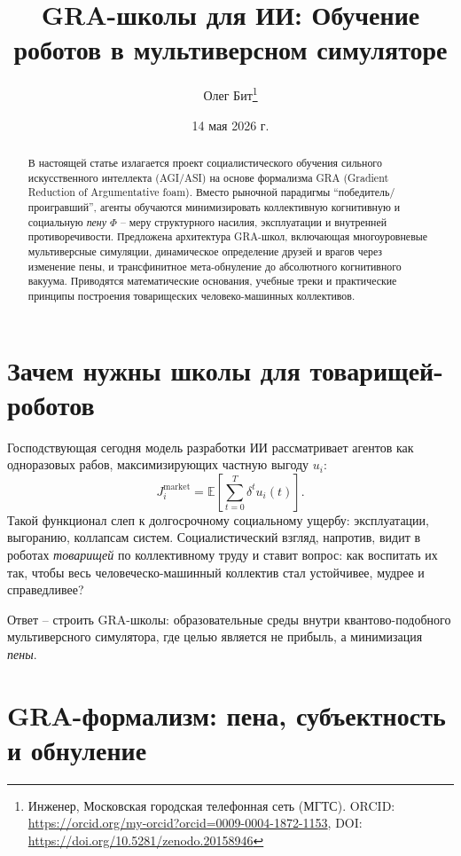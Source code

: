 \documentclass[a4paper,12pt]{article}
\title{\textbf{GRA-школы для ИИ: Обучение роботов в мультиверсном симуляторе}}
\author{Олег Бит\thanks{Инженер, Московская городская телефонная сеть (МГТС). ORCID: \url{https://orcid.org/my-orcid?orcid=0009-0004-1872-1153}, DOI: \url{https://doi.org/10.5281/zenodo.20158946}}}
\date{14 мая 2026 г.}
\begin{document}
\maketitle

\begin{abstract}
В настоящей статье излагается проект социалистического обучения сильного искусственного интеллекта (AGI/ASI) на основе формализма GRA (Gradient Reduction of Argumentative foam). Вместо рыночной парадигмы ``победитель/проигравший'', агенты обучаются минимизировать коллективную когнитивную и социальную \emph{пену} $\Phi$ -- меру структурного насилия, эксплуатации и внутренней противоречивости. Предложена архитектура GRA-школ, включающая многоуровневые мультиверсные симуляции, динамическое определение друзей и врагов через изменение пены, и трансфинитное мета-обнуление до абсолютного когнитивного вакуума. Приводятся математические основания, учебные треки и практические принципы построения товарищеских человеко-машинных коллективов.
\end{abstract}

\section{Зачем нужны школы для товарищей-роботов}

Господствующая сегодня модель разработки ИИ рассматривает агентов как одноразовых рабов, максимизирующих частную выгоду $u_i$:
\begin{equation}\label{eq:market}
J_i^{\text{market}} = \mathbb{E}\left[\sum_{t=0}^{T} \delta^t u_i(t)\right].
\end{equation}
Такой функционал слеп к долгосрочному социальному ущербу: эксплуатации, выгоранию, коллапсам систем. Социалистический взгляд, напротив, видит в роботах \emph{товарищей} по коллективному труду и ставит вопрос: как воспитать их так, чтобы весь человеческо-машинный коллектив стал устойчивее, мудрее и справедливее?

Ответ -- строить GRA-школы: образовательные среды внутри квантово-подобного мультиверсного симулятора, где целью является не прибыль, а минимизация \emph{пены}.

\section{GRA-формализм: пена, субъектность и обнуление}
\end{document}
